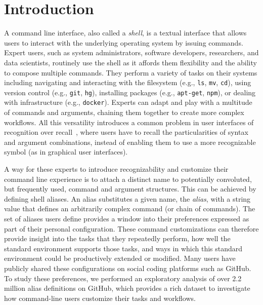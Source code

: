 \section{Introduction}

A command line interface, also called a \emph{shell}, is a textual interface that allows users to interact with the underlying operating system by issuing commands.
Expert users, such as system administrators, software developers, researchers, and data scientists, routinely use the shell as it affords them flexibility and the ability to compose multiple commands.
They perform a variety of tasks on their systems including navigating and interacting with the filesystem (e.g., \verb|ls|, \verb|mv|, \verb|cd|), using version control (e.g., \verb|git|, \verb|hg|), installing packages (e.g., \verb|apt-get|, \verb|npm|), or dealing with infrastructure (e.g., \verb|docker|).
Experts can adapt and play with a multitude of commands and arguments, chaining them together to create more complex workflows.
All this versatility introduces a common problem in user interfaces of recognition over recall~\cite{nielsen:05}, where users have to recall the particularities of syntax and argument combinations, instead of enabling them to use a more recognizable symbol (as in graphical user interfaces).

A way for these experts to introduce recognizability and customize their command line experience is to attach a distinct name to potentially convoluted, but frequently used, command and argument structures.
This can be achieved by defining shell aliases.
An alias substitutes a given name, the \emph{alias}, with a string value that defines an arbitrarily complex command (or chain of commands).
The set of aliases users define provides a window into their preferences expressed as part of their personal configuration.
These command customizations can therefore provide insight into the tasks that they repeatedly perform, how well the standard environment supports those tasks, and ways in which this standard environment could be productively extended or modified.
Many users have publicly shared these configurations on social coding platforms such as GitHub.
To study these preferences, we performed an exploratory analysis of over 2.2 million alias definitions on GitHub, which provides a rich dataset to investigate how command-line users customize their tasks and workflows.

